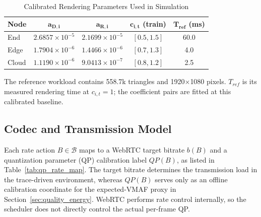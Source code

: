 \documentclass[10pt,journal,compsoc]{IEEEtran}
\begin{document}
\begin{table}[t]
	\centering
	\caption{Calibrated Rendering Parameters Used in Simulation}
	\label{tab:render_coefficients}
	\footnotesize
	\setlength{\tabcolsep}{3pt}
	\renewcommand{\arraystretch}{1.05}
	\begin{tabular*}{\columnwidth}{@{\extracolsep{\fill}}lcccc@{}}
		\toprule
		\textbf{Node} & $\boldsymbol{a_{D,i}}$ & $\boldsymbol{a_{R,i}}$ &
		$\boldsymbol{c_{i,t}}$ \textbf{(train)} & $\boldsymbol{T_{ref}}$ \textbf{(ms)} \\
		\midrule
		End   & $2.6857\!\times\!10^{-5}$ & $2.1699\!\times\!10^{-5}$ & $[0.5,1.5]$ & 60.0 \\
		Edge  & $1.7904\!\times\!10^{-6}$ & $1.4466\!\times\!10^{-6}$ & $[0.7,1.3]$ & 4.0 \\
		Cloud & $1.1190\!\times\!10^{-6}$ & $9.0413\!\times\!10^{-7}$ & $[0.8,1.2]$ & 2.5 \\
		\bottomrule
	\end{tabular*}
	\par\smallskip
	\raggedright\scriptsize The reference workload contains 558.7k triangles and
	1920$\times$1080 pixels. $T_{ref}$ is its measured rendering time at $c_{i,t}=1$;
	the coefficient pairs are fitted at this calibrated baseline.\par
\end{table}

\subsection{Codec and Transmission Model}
\label{sec:codec_transmission}

Each rate action $B\in\mathcal{B}$ maps to a WebRTC target bitrate $b(B)$ and a quantization parameter (QP) calibration label $QP(B)$, as listed in Table~\ref{tab:qp_rate_map}. The target bitrate determines the transmission load in the trace-driven environment, whereas $QP(B)$ serves only as an offline calibration coordinate for the expected-VMAF proxy in Section~\ref{sec:quality_energy}. WebRTC performs rate control internally, so the scheduler does not directly control the actual per-frame QP.
\end{document}
